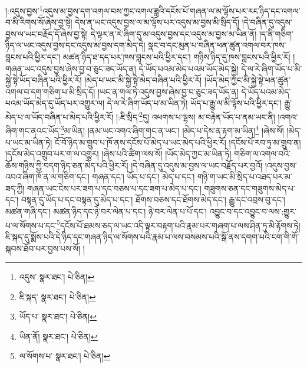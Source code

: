 །:འདུས་བྱས་\footnote{འདུས་  སྣར་ཐང་།  པེ་ཅིན། }འདུས་མ་བྱས་དག་འགལ་བས་ཀྱང་འགལ་ཟླའི་དངོས་པོ་གཞན་ལ་མ་ལྟོས་པར་རང་ཉིད་དང་འགལ་བ་མི་རིགས་སོ་ཞེས་བྱ་སྟེ། དེས་ན་ཡང་འདུས་བྱས་ལ་མ་ལྟོས་པར་འདུས་མ་བྱས་མི་སྲིད་དོ། །དེ་བཞིན་དུ་འདུས་བྱས་ལ་ཡང་བརྗོད་དོ་ཞེས་བྱ་སྟེ། དེ་ལྟར་ན་རེ་ཞིག་དུ་མ་འདུས་བྱས་དང་འདུས་མ་བྱས་མ་ཡིན་ནོ། །ད་ནི་གཅིག་ཉིད་ལ་ཡང་འདུས་བྱས་དང་འདུས་མ་བྱས་དག་མེད་དེ། སྣང་བ་དང་མུན་པ་བཞིན་ཕན་ཚུན་འགལ་བར་ཁས་བླངས་པའི་ཕྱིར་དང་། མཚན་ཉིད་ཐ་དད་པར་ཁས་བླངས་པའི་ཕྱིར་དང་། གཉིས་ཉིད་དུ་ཁས་བླངས་པའི་ཕྱིར་རོ། །གཞན་ཡང་འདུས་བྱས་ཞེས་བྱ་བ་ཅུང་ཟད་ཡོད་ན། དེ་ཡོད་པའམ་མེད་པའམ་ཡོད་མེད་སྐྱེ། དེ་ལ་རེ་ཞིག་ཡོད་པ་མི་སྐྱེ་སྟེ་ཡོད་བཞིན་པའི་ཕྱིར་རོ། །མེད་པ་ཡང་མི་སྐྱེ་སྟེ་མེད་བཞིན་པའི་ཕྱིར་རོ། །ཡོད་མེད་ཀྱང་མི་སྐྱེ་སྟེ་ཕན་ཚུན་འགལ་བ་དག་གཅིག་པ་མི་སྲིད་དོ། །ཡང་ན་གལ་ཏེ་འདུས་བྱས་ཞེས་བྱ་བ་ཅུང་ཟད་ཡོད་ན། དེ་ཡོད་པའམ་མེད་པའམ་ཡོད་མེད་དུ་ཡོད་པར་འགྱུར་ལ། དེ་ལ་རེ་ཞིག་ཡོད་པ་མ་ཡིན་ཏེ། ཡོད་པ་རྒྱུ་ལ་མི་ལྟོས་པའི་ཕྱིར་དང་། རྒྱུ་མེད་པ་ལ་ཡོད་བཞིན་པ་མེད་པའི་ཕྱིར་རོ། །:ཇི་སྲིད་\footnote{ཇི་སྐད་  སྣར་ཐང་།  པེ་ཅིན། }དུ། འཕགས་པ་ལྷས། མ་བརྟེན་ཡོད་པ་ནམ་ཡང་ནི། །འགའ་ཞིག་གང་ནའང་ཡོད་\footnote{ཡོད་པ་  སྣར་ཐང་།  པེ་ཅིན། }མ་ཡིན། །ནམ་ཡང་འགའ་ཞིག་གང་ན་ཡང་། །མེད་པ་དེས་ན་རྟག་མ་ཡིན།\footnote{ཡིན་ནོ།  སྣར་ཐང་།  པེ་ཅིན། } །ཞེས་སོ། །མེད་པ་ཡང་མ་ཡིན་ཏེ། ངོ་བོ་ཉིད་མ་གྲུབ་པ་ཁོ་ནས་དངོས་པོ་མེད་པ་ཡང་མེད་པའི་ཕྱིར་རོ། །དངོས་པོ་རབ་ཏུ་མ་གྲུབ་ན། །དངོས་མེད་འགྲུབ་པར་ག་ལ་འགྱུར། །ཞེས་པའི་ཚིག་ལས་སོ། །ཡོད་མེད་ཀྱང་མ་ཡིན་ཏེ། གཅིག་ལ་འགལ་བའི་ཆོས་གཉིས་ཀྱི་བདག་ཉིད་ཅན་མེད་པའི་ཕྱིར་རོ། །དེ་བཞིན་དུ་འདུས་མ་བྱས་ལ་ཡང་བརྗོད་པར་བྱའོ། །འདུས་བྱས་འབའ་ཞིག་ཁོ་ན་ལ་གཅིག་དང་། གཞན་དང་། ཡོད་པ་དང་། མེད་པ་དང་། གཉི་ག་ཡང་མི་སྲིད་པ་འཐད་པར་མ་ཟད་ཀྱི། གཞན་ཡང་ངེས་པར་ཟག་པ་དང་བཅས་པ་དང་ཟག་པ་མེད་པ་དང་། གཟུགས་ཅན་དང་གཟུགས་མེད་པ་དང་། བསྟན་དུ་ཡོད་པ་དང་བསྟན་དུ་མེད་པ་དང་། ཐོགས་བཅས་དང་ཐོགས་མེད་དང་། རྒྱུ་དང་འབྲས་བུ་དང་། མཚན་གཞི་དང་། མཚན་ཉིད་དང་ཉེ་བར་ལེན་པ་དང་། ཉེ་བར་ལེན་པ་པོ་དང་། འབྱུང་བ་དང་འབྱུང་བ་ལས་:གྱུར་པ་ལ་སོགས་པ་དང་\footnote{ལ་སོགས་པ་  སྣར་ཐང་།  པེ་ཅིན། }དངོས་པོ་ཐམས་ཅད་ལ་ཡང་འདི་ལྟར་བརྟག་པའི་རྣམ་པར་གཞག་པ་ལས་ཤིན་ཏུ་མི་རྟོགས་ཏེ། ཇི་སྐད་དུ་སྨོས་པའི་དེ་ཉིད་དང་གཞན་ཉིད་ལ་སོགས་པའི་རྣམ་པ་ལས་བསམས་པའི་སྒོ་ནས་དགག་པའི་ངག་གི་གོ་སྐབས་ཐོབ་པར་བྱས་པས་སོ། །
